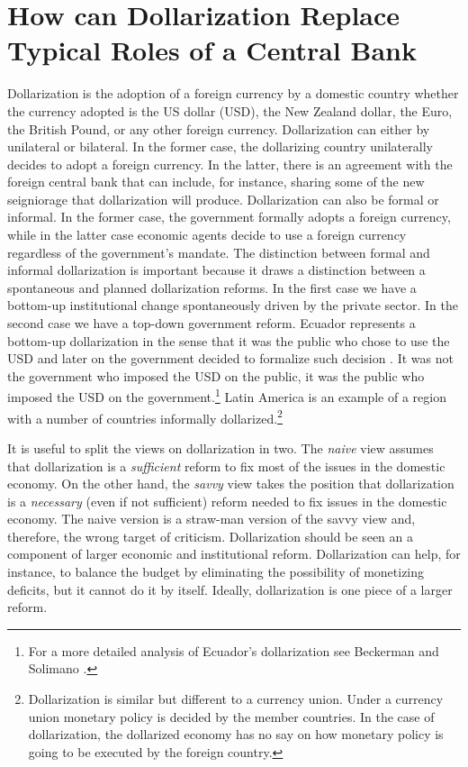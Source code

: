 \documentclass[12pt]{article}
\begin{document}
\section{How can Dollarization Replace Typical Roles of a Central Bank}
    \label{sec:debate}

Dollarization is the adoption of a foreign currency by a domestic country whether the currency adopted is the US dollar (USD), the New Zealand dollar, the Euro, the British Pound, or any other foreign currency. Dollarization can either by unilateral or bilateral. In the former case, the dollarizing country unilaterally decides to adopt a foreign currency. In the latter, there is an agreement with the foreign central bank that can include, for instance, sharing some of the new seigniorage that dollarization will produce. Dollarization can also be formal or informal. In the former case, the government formally adopts a foreign currency, while in the latter case economic agents decide to use a foreign currency regardless of the government's mandate. The distinction between formal and informal dollarization is important because it draws a distinction between a spontaneous and planned dollarization reforms. In the first case we have a bottom-up institutional change spontaneously driven by the private sector. In the second case we have a top-down government reform. Ecuador represents a bottom-up dollarization in the sense that it was the public who chose to use the USD and later on the government decided to formalize such decision \parencite{White2014a}. It was not the government who imposed the USD on the public, it was the public who imposed the USD on the government.\footnote{For a more detailed analysis of Ecuador's dollarization see Beckerman and Solimano \parencite*{Beckerman2002}.} Latin America is an example of a region with a number of countries informally dollarized.\footnote{Dollarization is similar but different to a currency union. Under a currency union monetary policy is decided by the member countries. In the case of dollarization, the dollarized economy has no say on how monetary policy is going to be executed by the foreign country.} 

It is useful to split the views on dollarization in two. The \textit{naive} view assumes that dollarization is a \textit{sufficient} reform to fix most of the issues in the domestic economy. On the other hand, the \textit{savvy} view takes the position that dollarization is a \textit{necessary} (even if not sufficient) reform needed to fix issues in the domestic economy. The naive version is a straw-man version of the savvy view and, therefore, the wrong target of criticism. Dollarization should be seen an a component of larger economic and institutional reform. Dollarization can help, for instance, to balance the budget by eliminating the possibility of monetizing deficits, but it cannot do it by itself. Ideally, dollarization is one piece of a larger reform.
\end{document}
